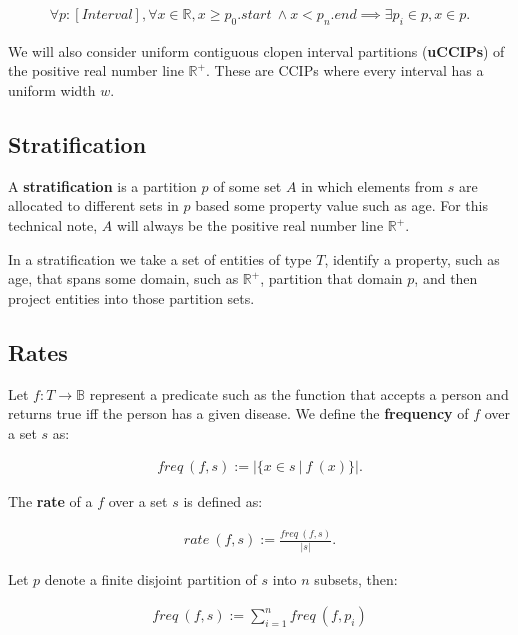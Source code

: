 \documentclass[]{article}
\begin{document}
\begin{align*}
\forall p : [Interval], \forall x \in \mathbb{R}, x \ge p_0.start\ \wedge x < p_n.end \implies \exists p_i \in p, x \in p.
\end{align*}

We will also consider uniform contiguous clopen interval partitions
(\textbf{uCCIPs}) of the positive real number line \(\mathbb{R}^+.\)
These are CCIPs where every interval has a uniform width \(w\).

\hypertarget{stratification}{%
\subsection{Stratification}\label{stratification}}

A \textbf{stratification} is a partition \(p\) of some set \(A\) in
which elements from \(s\) are allocated to different sets in \(p\) based
some property value such as age. For this technical note, \(A\) will
always be the positive real number line \(\mathbb{R}^+\).

In a stratification we take a set of entities of type \(T\), identify a
property, such as age, that spans some domain, such as \(\mathbb{R}^+\),
partition that domain \(p\), and then project entities into those
partition sets.

\hypertarget{rates}{%
\subsection{Rates}\label{rates}}

Let \(f : T \rightarrow \mathbb{B}\) represent a predicate such as the
function that accepts a person and returns true iff the person has a
given disease. We define the \textbf{frequency} of \(f\) over a set
\(s\) as:

\begin{align*}
freq\ (f, s) := |\{x \in s\ |\ f\ (x)\}|.
\end{align*}

The \textbf{rate} of a \(f\) over a set \(s\) is defined as:

\begin{align*}
rate\ (f, s) := \frac{freq\ (f, s)}{|s|}.
\end{align*}

Let \(p\) denote a finite disjoint partition of \(s\) into \(n\)
subsets, then:

\begin{align*}
freq\ (f, s) := \sum_{i=1}^n freq\ (f, p_i)
\end{align*}
\end{document}
